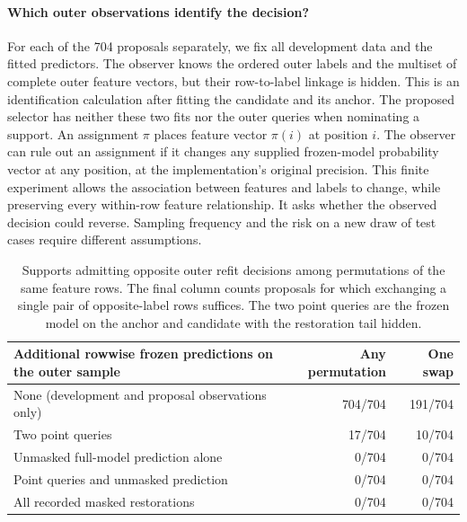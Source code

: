 \paragraph{Which outer observations identify the decision?}
For each of the 704 proposals separately, we fix all development data and the fitted predictors. The observer knows the ordered outer labels and the multiset of complete outer feature vectors, but their row-to-label linkage is hidden. This is an identification calculation after fitting the candidate and its anchor. The proposed selector has neither these two fits nor the outer queries when nominating a support. An assignment $\pi$ places feature vector $\pi(i)$ at position $i$. The observer can rule out an assignment if it changes any supplied frozen-model probability vector at any position, at the implementation's original precision. This finite experiment allows the association between features and labels to change, while preserving every within-row feature relationship. It asks whether the observed decision could reverse. Sampling frequency and the risk on a new draw of test cases require different assumptions.

\begin{table}[tb]
\centering\small
\caption{Supports admitting opposite outer refit decisions among permutations of the same feature rows. The final column counts proposals for which exchanging a single pair of opposite-label rows suffices. The two point queries are the frozen model on the anchor and candidate with the restoration tail hidden.}
\label{tab:observer-controls}
\begin{tabular}{@{}lrr@{}}
\toprule
Additional rowwise frozen predictions on the outer sample & Any permutation & One swap\\
\midrule
None (development and proposal observations only) & 704/704 & 191/704\\
Two point queries & 17/704 & 10/704\\
Unmasked full-model prediction alone & 0/704 & 0/704\\
Point queries and unmasked prediction & 0/704 & 0/704\\
All recorded masked restorations & 0/704 & 0/704\\
\bottomrule
\end{tabular}
\end{table}


